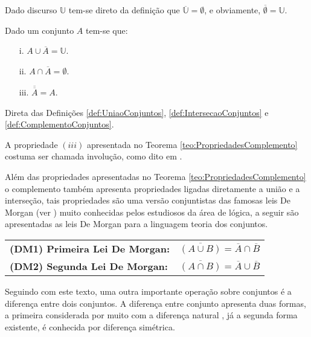 \begin{exemplo}\label{exe:ComplementoConjuntos2}
  Dado discurso $\mathbb{U}$ tem-se direto da definição que $\overline{\mathbb{U}} = \emptyset$, e obviamente, $\overline{\emptyset} = \mathbb{U}$.
\end{exemplo}

\begin{teorema}\label{teo:PropriedadesComplemento}
	Dado um conjunto $A$ tem-se que:
	\begin{itemize}
		\item[i.] $A \cup \overline{A} = \mathbb{U}$.
		\item[ii.] $A \cap \overline{A} = \emptyset$.
		\item[iii.] $\overline{\overline{A}} = A$.
	\end{itemize}
\end{teorema}

\begin{prova}
	Direta das Definições \ref{def:UniaoConjuntos}, \ref{def:IntersecaoConjuntos} e \ref{def:ComplementoConjuntos}.
\end{prova}

\begin{atencao}\label{note:Involucao}
  A propriedade $(iii)$ apresentada no Teorema \ref{teo:PropriedadesComplemento} costuma ser chamada involução, como dito em \cite{lipschutz1978-TC}.
\end{atencao}

Além das propriedades apresentadas no Teorema \ref{teo:PropriedadesComplemento} o complemento também apresenta propriedades ligadas diretamente a união e a interseção, tais propriedades são uma versão conjuntistas das famosas leis De Morgan (ver \cite{carmo2013, joaoPavao2014, lipschutz2013-MD}) muito conhecidas pelos estudiosos da área de lógica, a seguir são apresentadas as leis De Morgan para a linguagem teoria dos conjuntos.

\begin{table*}[h]
	\centering
	\begin{tabular}{lc}
		\textbf{(DM1) Primeira Lei De Morgan:} & $\overline{(A \cup B)} = \overline{A} \cap \overline{B}$\\
		\textbf{(DM2) Segunda Lei De Morgan:} & $\overline{(A \cap B)} = \overline{A} \cup \overline{B}$\\
	\end{tabular}
\end{table*}

Seguindo com este texto, uma outra importante operação sobre conjuntos é a diferença entre dois conjuntos. A diferença entre conjunto apresenta duas formas, a primeira considerada por muito com a diferença natural \cite{carmo2013}, já a segunda forma existente, é conhecida por diferença simétrica. %

